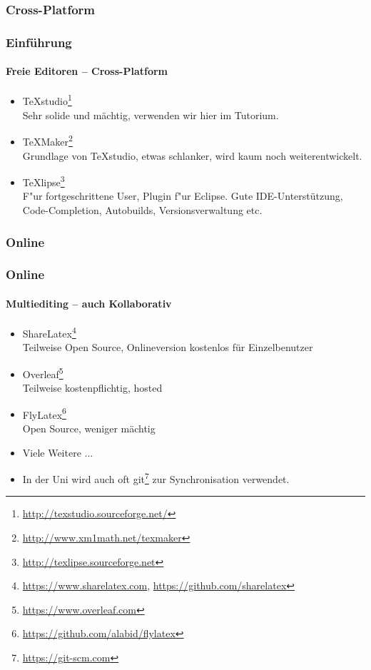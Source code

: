 \subsubsection{Cross-Platform}
\begin{frame}
\frametitle{Einf\"uhrung}
\framesubtitle{Freie Editoren -- Cross-Platform}
\begin{itemize}
  \item TeXstudio\footnote{\url{http://texstudio.sourceforge.net/}}\\
  Sehr solide und mächtig, verwenden wir hier im Tutorium.
  \item TeXMaker\footnote{\url{http://www.xm1math.net/texmaker}}\\
   Grundlage von TeXstudio, etwas schlanker, wird kaum noch weiterentwickelt.
  \item TeXlipse\footnote{\url{http://texlipse.sourceforge.net}}\\ F"ur fortgeschrittene User, Plugin f"ur
  Eclipse. Gute IDE-Unterst\"utzung, Code-Completion, Autobuilds, Versionsverwaltung etc.
\end{itemize}
\end{frame}


\subsubsection{Online}
\begin{frame}
\frametitle{Online}
\framesubtitle{Multiediting -- auch Kollaborativ}
\begin{itemize}
  \item ShareLatex\footnote{\url{https://www.sharelatex.com}, \url{https://github.com/sharelatex}}\\
  Teilweise Open Source, Onlineversion kostenlos für Einzelbenutzer
  \item Overleaf\footnote{\url{https://www.overleaf.com}}\\
  Teilweise kostenpflichtig, hosted
  \item FlyLatex\footnote{\url{https://github.com/alabid/flylatex}}\\ 
  Open Source, weniger mächtig
  \item Viele Weitere ...
  \vspace{7mm}
  \item In der Uni wird auch oft git\footnote{\url{https://git-scm.com}} zur Synchronisation verwendet.
\end{itemize}
\end{frame}


